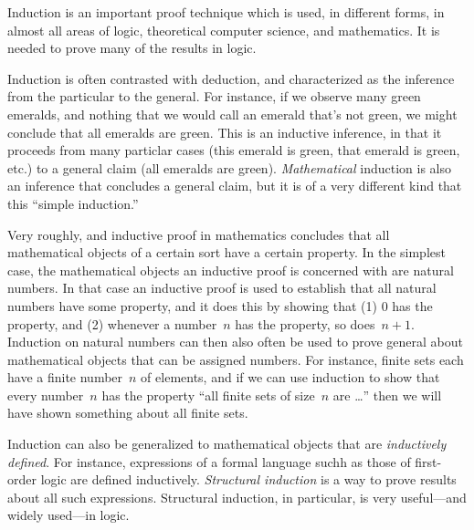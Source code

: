 \documentclass[../../../include/open-logic-section]{subfiles}
\begin{document}


Induction is an important proof technique which is used, in different
forms, in almost all areas of logic, theoretical computer science, and
mathematics.  It is needed to prove many of the results in logic.

Induction is often contrasted with deduction, and characterized as the
inference from the particular to the general.  For instance, if we
observe many green emeralds, and nothing that we would call an emerald
that's not green, we might conclude that all emeralds are green. This
is an inductive inference, in that it proceeds from many particlar
cases (this emerald is green, that emerald is green, etc.) to a
general claim (all emeralds are green).  \emph{Mathematical} induction
is also an inference that concludes a general claim, but it is of a
very different kind that this ``simple induction.''

Very roughly, and inductive proof in mathematics concludes that all
mathematical objects of a certain sort have a certain property.  In
the simplest case, the mathematical objects an inductive proof is
concerned with are natural numbers.  In that case an inductive proof
is used to establish that all natural numbers have some property, and
it does this by showing that (1) $0$ has the property, and (2)
whenever a number~$n$ has the property, so does~$n+1$.  Induction on
natural numbers can then also often be used to prove general about
mathematical objects that can be assigned numbers. For instance,
finite sets each have a finite number~$n$ of elements, and if we can
use induction to show that every number~$n$ has the property ``all
finite sets of size~$n$ are \dots'' then we will have shown something
about all finite sets.

Induction can also be generalized to mathematical objects that are
\emph{inductively defined}.  For instance, expressions of a formal
language suchh as those of first-order logic are defined inductively.
\emph{Structural induction} is a way to prove results about all such
expressions.  Structural induction, in particular, is very
useful---and widely used---in logic.
\end{document}
